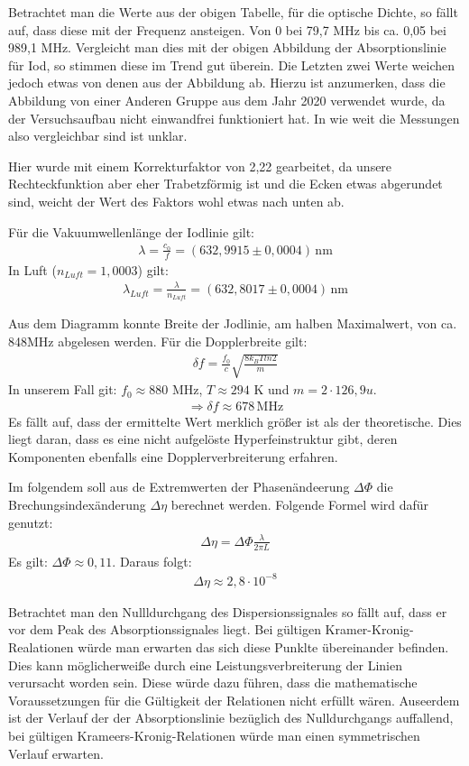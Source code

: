 Betrachtet man die Werte aus der obigen Tabelle, für die optische Dichte, so fällt auf, dass diese mit der Frequenz ansteigen. Von 0 bei 79,7 MHz bis ca. 0,05 bei 989,1 MHz. Vergleicht man dies mit der obigen Abbildung der Absorptionslinie für Iod, so stimmen diese im Trend gut überein. Die Letzten zwei Werte weichen jedoch etwas von denen aus der Abbildung ab. Hierzu ist anzumerken, dass die Abbildung von einer Anderen Gruppe aus dem Jahr 2020 verwendet wurde, da der Versuchsaufbau nicht einwandfrei funktioniert hat. In wie weit die Messungen also vergleichbar sind ist unklar.

Hier wurde mit einem Korrekturfaktor von 2,22 gearbeitet, da unsere Rechteckfunktion aber eher Trabetzförmig ist und die Ecken etwas abgerundet sind, weicht der Wert des Faktors wohl etwas nach unten ab.

Für die Vakuumwellenlänge der Iodlinie gilt:
\begin{gather}
    \lambda = \frac{c_0}{f} = (632,9915 \pm 0,0004) \, \text{nm}
\end{gather}
In Luft ($n_{Luft} = 1,0003$) gilt:
\begin{gather}
    \lambda_{Luft} = \frac{\lambda}{n_{Luft}} = (632,8017 \pm 0,0004)\, \text{nm}
\end{gather}

Aus dem Diagramm konnte Breite der Jodlinie, am halben Maximalwert, von ca. 848MHz abgelesen werden.
Für die Dopplerbreite gilt:
\begin{gather}
    \delta f = \frac{f_0}{c} \sqrt{\frac{8 k_B T ln2}{m}}
\end{gather}
In unserem Fall git: $f_0 \approx 880$ MHz,  $T \approx 294$ K und $m = 2 \cdot 126,9 u$.
\begin{gather}
    \Rightarrow \delta f \approx 678 \, \text{MHz}
\end{gather}
Es fällt auf, dass der ermittelte Wert merklich größer ist als der theoretische. Dies liegt daran, dass es eine nicht aufgelöste Hyperfeinstruktur gibt, deren Komponenten ebenfalls eine Dopplerverbreiterung erfahren.


Im folgendem soll aus de Extremwerten der Phasenändeerung $\Delta \Phi$ die Brechungsindexänderung $\Delta \eta$ berechnet werden. Folgende Formel wird dafür genutzt:
\begin{gather}
    \Delta \eta = \Delta \Phi \frac{\lambda}{2 \pi L}
\end{gather}
Es gilt: $\Delta \Phi \approx 0,11$. Daraus folgt:
\begin{gather}
    \Delta \eta \approx 2,8 \cdot 10^{-8}
\end{gather}

Betrachtet man den Nullldurchgang des Dispersionssignales so fällt auf, dass er vor dem Peak des Absorptionssignales liegt. Bei gültigen Kramer-Kronig-Realationen würde man erwarten das sich diese Punklte übereinander befinden. Dies kann möglicherweiße durch eine Leistungsverbreiterung der Linien verursacht worden sein. Diese würde dazu führen, dass die mathematische Voraussetzungen für die Gültigkeit der Relationen nicht erfüllt wären.
Auseerdem ist der Verlauf der der Absorptionslinie bezüglich des Nulldurchgangs auffallend, bei gültigen Krameers-Kronig-Relationen würde man einen symmetrischen Verlauf erwarten.
